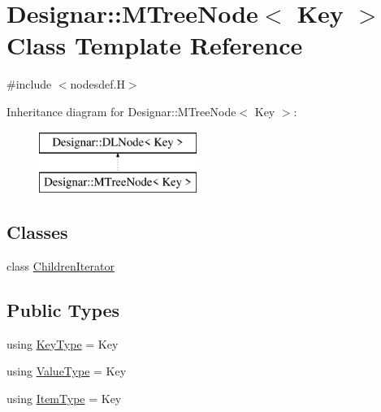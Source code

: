 \hypertarget{class_designar_1_1_m_tree_node}{}\section{Designar\+:\+:M\+Tree\+Node$<$ Key $>$ Class Template Reference}
\label{class_designar_1_1_m_tree_node}


{\ttfamily \#include $<$nodesdef.\+H$>$}

Inheritance diagram for Designar\+:\+:M\+Tree\+Node$<$ Key $>$\+:\begin{figure}[H]
\begin{center}
\leavevmode
\includegraphics[height=2.000000cm]{class_designar_1_1_m_tree_node}
\end{center}
\end{figure}
\subsection*{Classes}
\begin{DoxyCompactItemize}
\item 
class \hyperlink{class_designar_1_1_m_tree_node_1_1_children_iterator}{Children\+Iterator}
\end{DoxyCompactItemize}
\subsection*{Public Types}
\begin{DoxyCompactItemize}
\item 
using \hyperlink{class_designar_1_1_m_tree_node_ad45f6141e36722448b45aecde08761a0}{Key\+Type} = Key
\item 
using \hyperlink{class_designar_1_1_m_tree_node_a0f65c3ec41fb24ab7764c01cd949d6be}{Value\+Type} = Key
\item 
using \hyperlink{class_designar_1_1_m_tree_node_aa649a0376eb81e3da0f4dcbd36871b4b}{Item\+Type} = Key
\end{DoxyCompactItemize}
